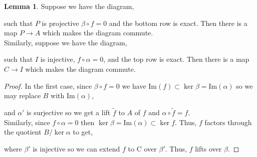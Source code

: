 \documentclass[12pt]{article}
\renewcommand{\Im}[1]{\mathrm{Im}(#1)}
\theoremstyle{remark}
\theoremstyle{definition}
\newtheorem{lemma}[theorem]{Lemma}
\begin{document}
\begin{lemma} \label{lifting_over_exact}
Suppose we have the diagram,
\begin{center}
\end{center}
such that $P$ is projective $\beta \circ f = 0$ and the bottom row is exact. Then there is a map $P \to A$ which makes the diagram commute.
\bigskip\\
Similarly,
suppose we have the diagram,
\begin{center}
\end{center}
such that $I$ is injective, $f \circ \alpha = 0$, and the top row is exact. Then there is a map $C \to I$ which makes the diagram commute.
\end{lemma}

\begin{proof}
In the first case, since $\beta \circ f = 0$ we have $\Im{f} \subset \ker{\beta} = \Im{\alpha}$ so we may replace $B$ with $\Im{\alpha}$,
\begin{center}
\end{center}
and $\alpha'$ is surjective so we get a lift $\tilde{f}$ to $A$ of $f$ and $\alpha \circ \tilde{f} = f$.
\bigskip\\
Similarly, since $f \circ \alpha = 0$ then $\ker{\beta} = \Im{\alpha} \subset \ker{f}$. Thus, $f$ factors through the quotient $B / \ker{\alpha}$ to get,
\begin{center}
\end{center}
where $\beta'$ is injective so we can extend $f$ to C over $\beta'$. Thus, $f$ lifts over $\beta$.  
\end{proof}
\end{document}
